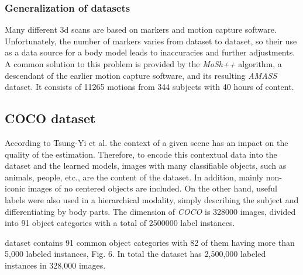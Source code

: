 \subsubsection{Generalization of datasets}
Many different 3d scans are based on markers and motion capture software. Unfortunately, the number of markers varies from dataset to dataset, so their use as a data source for a body model leads to inaccuracies and further adjustments. A common solution to this problem is provided by the \emph{MoSh++} algorithm, a descendant of the earlier motion capture software, and its resulting \emph{AMASS} dataset. It consists of 11265 motions from 344 subjects with 40 hours of content.\cite{amass}

\subsection{COCO dataset} 
According to Tsung-Yi et al. the context of a given scene has an impact on the quality of the estimation. Therefore, to encode this contextual data into the dataset and the learned models, images with many classifiable objects, such as animals, people, etc., are the content of the dataset. In addition, mainly non-iconic images of no centered objects are included. On the other hand, useful labels were also used in a hierarchical modality, simply describing the subject and differentiating by body parts. The dimension of \emph{COCO} is 328000 images, divided into 91 object categories with a total of 2500000 label instances. \cite{coco}

dataset contains 91 common object categories
with 82 of them having more than 5,000 labeled instances, Fig. 6. In total the dataset has 2,500,000 labeled
instances in 328,000 images. 
\cite{mpii}